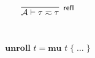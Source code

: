 \documentclass[a4paper, 12pt, openany, oneside]{book}
\newcommand{\typeeq}{\rotatebox[origin=c]{180}{$\;\simeq\;$}}
\begin{document}
$$
\infer[\textsf{\small{refl}}]{
    \mathcal{A} \vdash \tau \typeeq \tau
}{}
$$
 \\ \\
$$
\textbf{unroll } t = \textbf{mu } t\; \{\; \dots\; \}
$$
\end{document}
